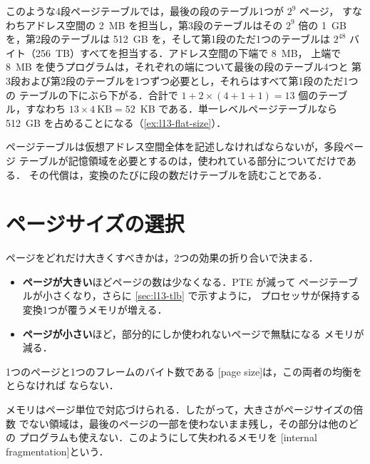 \documentclass[../main.tex]{subfiles}
\begin{document}
\begin{example}
  \label{ex:l13-four-level}
  このような4段ページテーブルでは，最後の段のテーブル1つが $2^{9}$ ページ，
  すなわちアドレス空間の 2~MB を担当し，第3段のテーブルはその $2^{9}$ 倍の
  1~GB を，第2段のテーブルは 512~GB を，そして第1段のただ1つのテーブルは
  $2^{48}$ バイト（256~TB）すべてを担当する．アドレス空間の下端で 8~MB，
  上端で 8~MB を使うプログラムは，それぞれの端について最後の段のテーブル4つと
  第3段および第2段のテーブルを1つずつ必要とし，それらはすべて第1段のただ1つの
  テーブルの下にぶら下がる．合計で
  $1 + 2 \times (4 + 1 + 1) = 13$ 個のテーブル，すなわち
  $13 \times 4~\text{KB} = 52$~KB である．単一レベルページテーブルなら
  512~GB を占めることになる（\cref{ex:l13-flat-size}）．
\end{example}

\begin{keypoint}
  ページテーブルは仮想アドレス空間全体を記述しなければならないが，多段ページ
  テーブルが記憶領域を必要とするのは，使われている部分についてだけである．
  その代償は，変換のたびに段の数だけテーブルを読むことである．
\end{keypoint}

\section{ページサイズの選択}
\label{sec:l13-page-size}

ページをどれだけ大きくすべきかは，2つの効果の折り合いで決まる．
\begin{itemize}
  \item \textbf{ページが大きい}ほどページの数は少なくなる．PTE が減って
    ページテーブルが小さくなり，さらに \cref{sec:l13-tlb} で示すように，
    プロセッサが保持する変換1つが覆うメモリが増える．
  \item \textbf{ページが小さい}ほど，部分的にしか使われないページで無駄になる
    メモリが減る．
\end{itemize}
1つのページと1つのフレームのバイト数である
[page size]は，この両者の均衡をとらなければ
ならない．

\begin{definition}[内部断片化]
  メモリはページ単位で対応づけられる．したがって，大きさがページサイズの倍数
  でない領域は，最後のページの一部を使わないまま残し，その部分は他のどの
  プログラムも使えない．このようにして失われるメモリを
  [internal fragmentation]という．
\end{definition}
\end{document}
